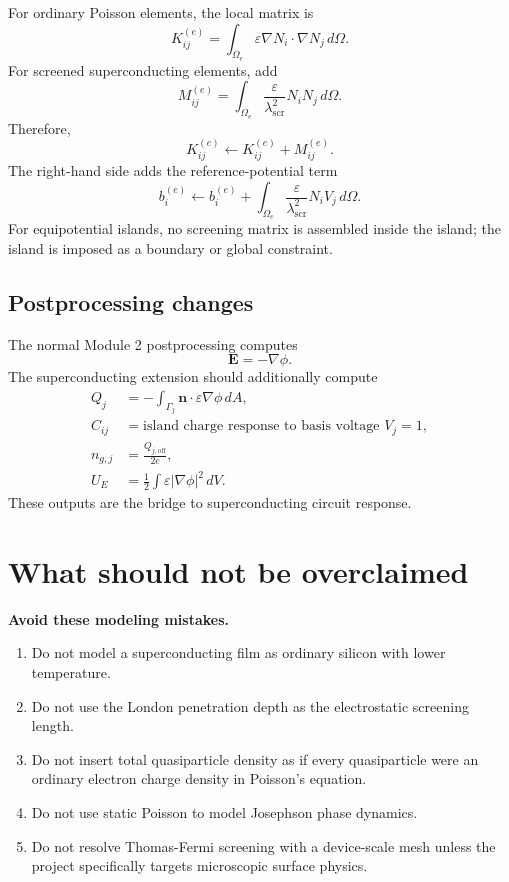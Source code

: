 \documentclass[11pt]{article}
\newcommand{\Evec}{\mathbf{E}}
\newcommand{\nvecb}{\mathbf{n}}
\newcommand{\lams}{\lambda_{\mathrm{scr}}}
\begin{document}
For ordinary Poisson elements, the local matrix is
\begin{equation}
K_{ij}^{(e)}=\int_{\Omega_e}\varepsilon \nabla N_i\cdot\nabla N_j\,d\Omega.
\end{equation}
For screened superconducting elements, add
\begin{equation}
M_{ij}^{(e)}=\int_{\Omega_e}\frac{\varepsilon}{\lams^2}N_iN_j\,d\Omega.
\end{equation}
Therefore,
\begin{equation}
K_{ij}^{(e)}\leftarrow K_{ij}^{(e)}+M_{ij}^{(e)}.
\end{equation}
The right-hand side adds the reference-potential term
\begin{equation}
b_i^{(e)}\leftarrow b_i^{(e)}+\int_{\Omega_e}\frac{\varepsilon}{\lams^2}N_iV_j\,d\Omega.
\end{equation}
For equipotential islands, no screening matrix is assembled inside the island; the island is imposed as a boundary or global constraint.

\subsection{Postprocessing changes}

The normal Module 2 postprocessing computes
\begin{equation}
\Evec=-\nabla\phi.
\end{equation}
The superconducting extension should additionally compute
\begin{align}
Q_j &= -\int_{\Gamma_j}\nvecb\cdot\varepsilon\nabla\phi\,dA,\\
C_{ij} &= \text{island charge response to basis voltage }V_j=1,\\
n_{g,j} &= \frac{Q_{j,\mathrm{off}}}{2e},\\
U_E &= \frac{1}{2}\int \varepsilon |\nabla\phi|^2\,dV.
\end{align}
These outputs are the bridge to superconducting circuit response.

\section{What should not be overclaimed}

\begin{notebox}
\textbf{Avoid these modeling mistakes.}
\begin{enumerate}[leftmargin=2em]
\item Do not model a superconducting film as ordinary silicon with lower temperature.
\item Do not use the London penetration depth as the electrostatic screening length.
\item Do not insert total quasiparticle density as if every quasiparticle were an ordinary electron charge density in Poisson's equation.
\item Do not use static Poisson to model Josephson phase dynamics.
\item Do not resolve Thomas-Fermi screening with a device-scale mesh unless the project specifically targets microscopic surface physics.
\end{enumerate}
\end{notebox}
\end{document}
